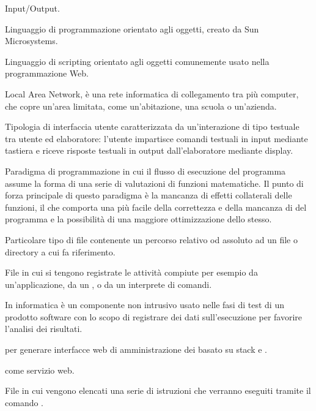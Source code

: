 Input/Output.


Linguaggio di programmazione orientato agli oggetti, creato da Sun Microsystems.

Linguaggio di scripting orientato agli oggetti comunemente usato nella programmazione Web.


Local Area Network, è una rete informatica di collegamento tra più computer, che copre un'area limitata, come un'abitazione, una scuola o un'azienda.

Tipologia di interfaccia utente caratterizzata da un'interazione di tipo testuale tra utente ed elaboratore: l'utente impartisce comandi testuali in input mediante tastiera e riceve risposte testuali in output dall'elaboratore mediante display.

Paradigma di programmazione in cui il flusso di esecuzione del programma assume la forma di una serie di valutazioni di funzioni matematiche. Il punto di forza principale di questo paradigma è la mancanza di effetti collaterali delle funzioni, il che comporta una più facile  della correttezza e della mancanza di  del programma e la possibilità di una maggiore ottimizzazione dello stesso.

Particolare tipo di file contenente un percorso relativo od assoluto ad un file o directory a cui fa riferimento.

File in cui si tengono registrate le attività compiute per esempio da un'applicazione, da un , o da un interprete di comandi.

In informatica è un componente non intrusivo usato nelle fasi di test di un prodotto software con lo scopo di registrare dei dati sull'esecuzione per favorire l'analisi dei risultati.


 per generare interfacce web di amministrazione dei  basato su stack  e .

\ProjectName{} come servizio web.

File in cui vengono elencati una serie di istruzioni che verranno eseguiti tramite il comando .

